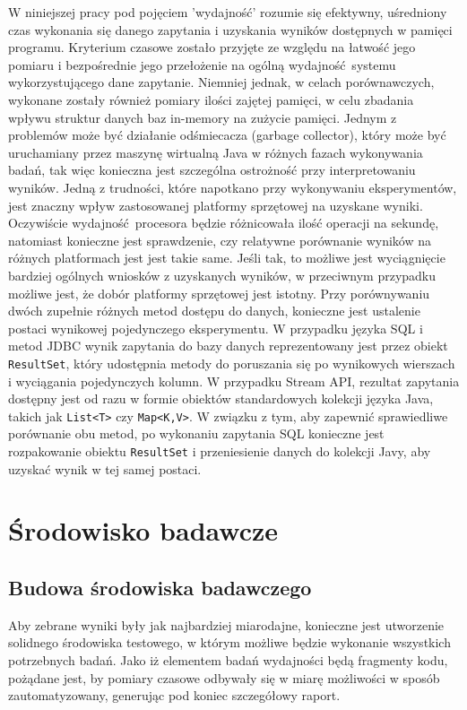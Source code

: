 \documentclass[12pt]{extarticle}
\begin{document}
    W niniejszej pracy pod pojęciem 'wydajność' rozumie się efektywny, uśredniony czas wykonania się danego zapytania i uzyskania wyników dostępnych w pamięci programu. Kryterium czasowe zostało przyjęte ze względu na łatwość jego pomiaru i bezpośrednie jego przełożenie na ogólną wydajność systemu wykorzystującego dane zapytanie. Niemniej jednak, w celach porównawczych, wykonane zostały również pomiary ilości zajętej pamięci, w celu zbadania wpływu struktur danych baz in-memory na zużycie pamięci. Jednym z problemów może być działanie odśmiecacza (garbage collector), który może być uruchamiany przez maszynę wirtualną Java w różnych fazach wykonywania badań, tak więc konieczna jest szczególna ostrożność przy interpretowaniu wyników.
    Jedną z trudności, które napotkano przy wykonywaniu eksperymentów, jest znaczny wpływ zastosowanej platformy sprzętowej na uzyskane wyniki. Oczywiście wydajność procesora będzie różnicowała ilość operacji na sekundę, natomiast konieczne jest sprawdzenie, czy relatywne porównanie wyników na różnych platformach jest jest takie same. Jeśli tak, to możliwe jest wyciągnięcie bardziej ogólnych wniosków z uzyskanych wyników, w przeciwnym przypadku możliwe jest, że dobór platformy sprzętowej jest istotny.
    Przy porównywaniu dwóch zupełnie różnych metod dostępu do danych, konieczne jest ustalenie postaci wynikowej pojedynczego eksperymentu. W przypadku języka SQL i metod JDBC wynik zapytania do bazy danych reprezentowany jest przez obiekt \texttt{ResultSet}, który udostępnia metody do poruszania się po wynikowych wierszach i wyciągania pojedynczych kolumn. W przypadku Stream API, rezultat zapytania dostępny jest od razu w formie obiektów standardowych kolekcji języka Java, takich jak \texttt{List<T>} czy \texttt{Map<K,V>}. W związku z tym, aby zapewnić sprawiedliwe porównanie obu metod, po wykonaniu zapytania SQL konieczne jest rozpakowanie obiektu \texttt{ResultSet} i przeniesienie danych do kolekcji Javy, aby uzyskać wynik w tej samej postaci.

\section{Środowisko badawcze}

\subsection{Budowa środowiska badawczego}

    Aby zebrane wyniki były jak najbardziej miarodajne, konieczne jest utworzenie solidnego środowiska testowego, w którym możliwe będzie wykonanie wszystkich potrzebnych badań. Jako iż elementem badań wydajności będą fragmenty kodu, pożądane jest, by pomiary czasowe odbywały się w miarę możliwości w sposób zautomatyzowany, generując pod koniec szczegółowy raport.
\end{document}
